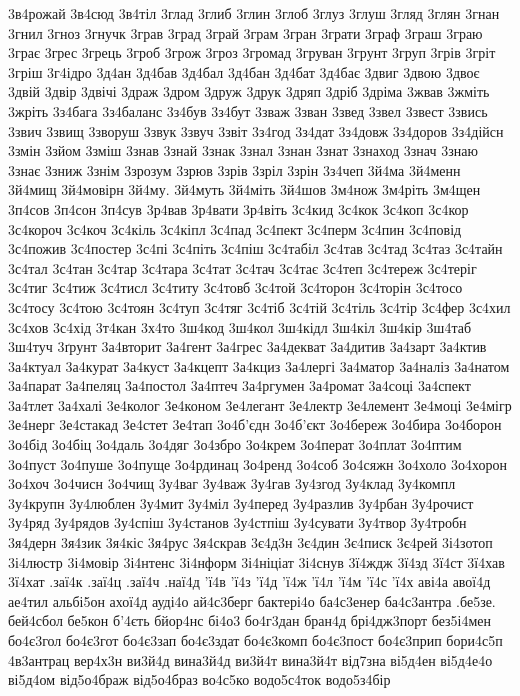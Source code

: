 {3в4рожай
3в4сюд
3в4тіл
3глад
3глиб
3глин
3глоб
3глуз
3глуш
3гляд
3глян
3гнан
3гнил
3гноз
3гнучк
3грав
3град
3грай
3грам
3гран
3грати
3граф
3граш
3граю
3грає
3грес
3грець
3гроб
3грож
3гроз
3громад
3груван
3грунт
3груп
3грів
3гріт
3гріш
3г4ідро
3д4ан
3д4бав
3д4бал
3д4бан
3д4бат
3д4бає
3двиг
3двою
3двоє
3двій
3двір
3двічі
3драж
3дром
3друж
3друк
3дряп
3дріб
3дріма
3жвав
3жміть
3жріть
3з4бага
3з4баланс
3з4був
3з4бут
3зваж
3зван
3звед
3звел
3звест
3звись
3звич
3звищ
3зворуш
3звук
3звуч
3звіт
3з4год
3з4дат
3з4довж
3з4доров
3з4дійсн
3змін
3зйом
3зміш
3знав
3знай
3знак
3знал
3знан
3знат
3знаход
3знач
3знаю
3знає
3зниж
3знім
3зрозум
3зрюв
3зрів
3зріл
3зрін
3з4чеп
3й4ма
3й4менн
3й4мищ
3й4мовірн
3й4му.
3й4муть
3й4міть
3й4шов
3м4нож
3м4ріть
3м4щен
3п4сов
3п4сон
3п4сув
3р4вав
3р4вати
3р4віть
3с4кид
3с4кок
3с4коп
3с4кор
3с4короч
3с4коч
3с4кіль
3с4кіпл
3с4пад
3с4пект
3с4перм
3с4пин
3с4повід
3с4пожив
3с4постер
3с4пі
3с4піть
3с4піш
3с4табіл
3с4тав
3с4тад
3с4таз
3с4тайн
3с4тал
3с4тан
3с4тар
3с4тара
3с4тат
3с4тач
3с4тає
3с4теп
3с4тереж
3с4теріг
3с4тиг
3с4тиж
3с4тисл
3с4титу
3с4товб
3с4той
3с4торон
3с4торін
3с4тосо
3с4тосу
3с4тою
3с4тоян
3с4туп
3с4тяг
3с4тіб
3с4тій
3с4тіль
3с4тір
3с4фер
3с4хил
3с4хов
3с4хід
3т4кан
3х4то
3ш4код
3ш4кол
3ш4кідл
3ш4кіл
3ш4кір
3ш4таб
3ш4туч
3ґрунт
3а4вторит
3а4гент
3а4грес
3а4декват
3а4дитив
3а4зарт
3а4ктив
3а4ктуал
3а4курат
3а4куст
3а4кцепт
3а4кциз
3а4лергі
3а4матор
3а4наліз
3а4натом
3а4парат
3а4пеляц
3а4постол
3а4птеч
3а4ргумен
3а4ромат
3а4соці
3а4спект
3а4тлет
3а4халі
3е4колог
3е4коном
3е4легант
3е4лектр
3е4лемент
3е4моці
3е4мігр
3е4нерг
3е4стакад
3е4стет
3е4тап
3о4б'єдн
3о4б'єкт
3о4береж
3о4бира
3о4борон
3о4бід
3о4біц
3о4даль
3о4дяг
3о4збро
3о4крем
3о4перат
3о4плат
3о4птим
3о4пуст
3о4пуше
3о4пуще
3о4рдинац
3о4ренд
3о4соб
3о4сяжн
3о4холо
3о4хорон
3о4хоч
3о4чисн
3о4чищ
3у4ваг
3у4важ
3у4гав
3у4згод
3у4клад
3у4компл
3у4крупн
3у4люблен
3у4мит
3у4міл
3у4перед
3у4разлив
3у4рбан
3у4рочист
3у4ряд
3у4рядов
3у4спіш
3у4станов
3у4стпіш
3у4сувати
3у4твор
3у4тробн
3я4дерн
3я4зик
3я4кіс
3я4рус
3я4скрав
3є4д3н
3є4дин
3є4писк
3є4рей
3і4зотоп
3і4люстр
3і4мовір
3і4нтенс
3і4нформ
3і4ніціат
3і4снув
3ї4ждж
3ї4зд
3ї4ст
3ї4хав
3ї4хат
.заї4к
.заї4ц
.заї4ч
.наї4д
'ї4в
'ї4з
'ї4д
'ї4ж
'ї4л
'ї4м
'ї4с
'ї4х
аві4а
авої4д
ае4тил
альбі5он
ахої4д
ауді4о
ай4с3берг
бактері4о
ба4с3енер
ба4с3антра
.бе5зе.
бей4сбол
бе5кон
б'4єть
бйор4нс
бі4о3
бо4г3дан
бран4д
брі4дж3порт
без5і4мен
бо4є3гол
бо4є3гот
бо4є3зап
бо4є3здат
бо4є3комп
бо4є3пост
бо4є3прип
бори4с5п
4в3антрац
вер4х3н
ви3й4д
вина3й4д
ви3й4т
вина3й4т
від7зна
ві5д4ен
ві5д4е4о
ві5д4ом
від5о4браж
від5о4браз
во4с5ко
водо5с4ток
водо5з4бір
}
